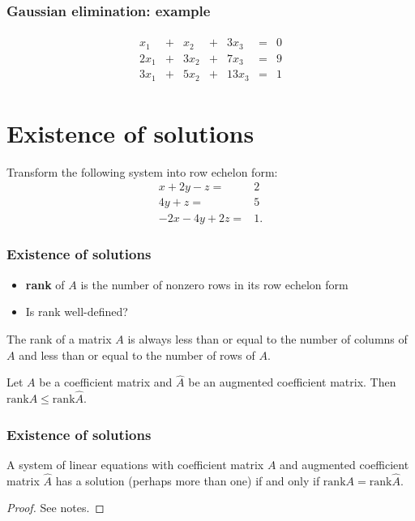 \documentclass[compress]{beamer}
\newcommand{\rank}{\mathrm{rank}}
\begin{document}
\begin{frame}
  \frametitle{Gaussian elimination: example} 
  \begin{align*}
    \begin{array}{ccccccc}
      x_1  &+ & x_2  &+& 3 x_3 &=& 0 \\
      2x_1 &+ & 3x_2 &+&  7 x_3 &=& 9 \\
      3x_1 &+ & 5x_2 &+& 13x_3  &=& 1 
    \end{array}
  \end{align*}
\end{frame}

\section{Existence of solutions}
\begin{frame}
  Transform the following system into row echelon form:
  \begin{align*}
    x + 2 y - z = & 2 \\
    4 y + z = & 5 \\
    -2x - 4y + 2z = & 1.
  \end{align*}
\end{frame}

\begin{frame}
  \frametitle{Existence of solutions}
  \begin{itemize}
  \item \textbf{rank} of $A$ is the number of nonzero rows in its row
    echelon form
  \item Is rank well-defined?
  \end{itemize}
  
  \begin{lemma}\label{lem:rankcr}
    The rank of a matrix $A$ is always less than or equal to the number
    of columns of $A$ and less than or equal to the number of rows of $A$.
  \end{lemma}
  
  \begin{lemma}\label{lem:rankaug}
    Let $A$ be a coefficient matrix and $\hat{A}$ be an augmented
    coefficient matrix. Then $\rank A \leq \rank \hat{A}$.
  \end{lemma}
\end{frame}


\begin{frame}
  \frametitle{Existence of solutions}
  \begin{theorem}\label{thm:exist}
    A system of linear equations with coefficient matrix $A$ and
    augmented coefficient matrix $\hat{A}$ has a solution (perhaps more
    than one) if and only if $\rank A = \rank \hat{A}$.
  \end{theorem}
  \begin{proof}
    See notes.
  \end{proof}
\end{frame}
\end{document}
